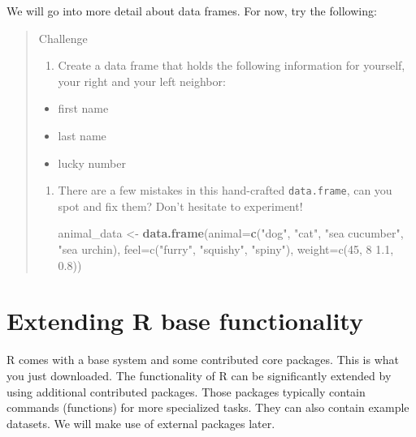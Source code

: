 \documentclass[
]{book}
\newenvironment{Shaded}{\begin{snugshade}}{\end{snugshade}}
\newcommand{\AttributeTok}[1]{\textcolor[rgb]{0.13,0.29,0.53}{#1}}
\newcommand{\FunctionTok}[1]{\textcolor[rgb]{0.13,0.29,0.53}{\textbf{#1}}}
\newcommand{\NormalTok}[1]{#1}
\newcommand{\OtherTok}[1]{\textcolor[rgb]{0.56,0.35,0.01}{#1}}
\newcommand{\StringTok}[1]{\textcolor[rgb]{0.31,0.60,0.02}{#1}}
\providecommand{\tightlist}{%
  \setlength{\itemsep}{0pt}\setlength{\parskip}{0pt}}
\begin{document}
We will go into more detail about data frames. For now, try the following:

\begin{quote}
Challenge

\begin{enumerate}
\def\labelenumi{\arabic{enumi}.}
\tightlist
\item
  Create a data frame that holds the following information for yourself,
  your right and your left neighbor:
\end{enumerate}

\begin{itemize}
\tightlist
\item
  first name
\item
  last name
\item
  lucky number
\end{itemize}

\begin{enumerate}
\def\labelenumi{\arabic{enumi}.}
\setcounter{enumi}{1}
\item
  There are
  a few mistakes in this hand-crafted \texttt{data.frame}, can you spot and fix them?
  Don't hesitate to experiment!

\begin{Shaded}
\begin{Highlighting}[]
\NormalTok{animal\_data }\OtherTok{\textless{}{-}} \FunctionTok{data.frame}\NormalTok{(}\AttributeTok{animal=}\FunctionTok{c}\NormalTok{(}\StringTok{"dog"}\NormalTok{, }\StringTok{"cat"}\NormalTok{, }\StringTok{"sea cucumber"}\NormalTok{, }\StringTok{"sea urchin),}
\StringTok{                          feel=c("}\NormalTok{furry}\StringTok{", "}\NormalTok{squishy}\StringTok{", "}\NormalTok{spiny}\StringTok{"),}
\StringTok{                          weight=c(45, 8 1.1, 0.8))}
\end{Highlighting}
\end{Shaded}
\end{enumerate}
\end{quote}

\section{Extending R base functionality}\label{extending-r-base-functionality}

R comes with a base system and some contributed core packages. This is what you just downloaded. The functionality of R can be significantly extended by using additional contributed packages. Those packages typically contain commands (functions) for more specialized tasks. They can also contain example datasets. We will make use of external packages later.
\end{document}
